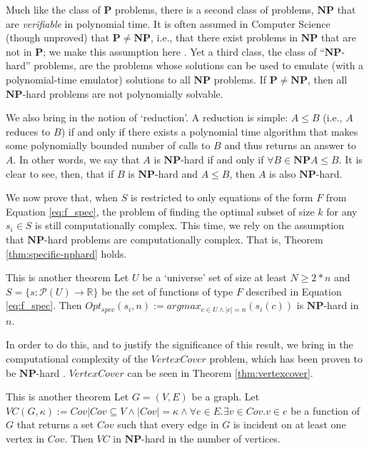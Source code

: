 Much like the class of $\mathbf{P}$ problems, there is a second class of problems, $\mathbf{NP}$ that are \textit{verifiable} in polynomial time. It is often assumed in Computer Science (though unproved) that $\mathbf{P} \neq \mathbf{NP}$, i.e., that there exist problems in $\mathbf{NP}$ that are not in $\mathbf{P}$; we make this assumption here \cite{COPPERSMITH198527}. Yet a third class, the class of ``$\mathbf{NP}$-hard'' problems, are the problems whose solutions can be used to emulate (with a polynomial-time emulator) solutions to all $\mathbf{NP}$ problems. If $\mathbf{P} \neq \mathbf{NP}$, then all $\mathbf{NP}$-hard problems are not polynomially solvable.

We also bring in the notion of `reduction'. A reduction is simple: $A \leq B$ (i.e., $A$ reduces to $B$) if and only if there exists a polynomial time algorithm that makes some polynomially bounded number of calls to $B$ and thus returns an answer to $A$. In other words, we say that $A$ is $\mathbf{NP}$-hard if and only if $\forall B \in \mathbf{NP} A \leq B$. It is clear to see, then, that if $B$ is $\mathbf{NP}$-hard and $A \leq B$, then $A$ is also $\mathbf{NP}$-hard.

We now prove that, when $S$ is restricted to only equations of the form $F$ from Equation \ref{eq:f_spec}, the problem of finding the optimal subset of size $k$ for any $s_i \in S$ is still computationally complex. This time, we rely on the assumption that $\mathbf{NP}$-hard problems are computationally complex. That is, Theorem \ref{thm:specific-nphard} holds. 

\begin{theorem}\label{thm:specific-nphard}
    This is another theorem
    Let $U$ be a `universe' set of size at least $N \geq 2*n$ and $S = \{s: \mathcal{P} (U) \rightarrow \mathbb{R}\}$ be the set of functions of type $F$ described in Equation \ref{eq:f_spec}. Then $Opt_{spec}(s_i, n) := argmax_{c \in U \land |c| = n}(s_i(c))$ is $\mathbf{NP}$-hard in $n$.
\end{theorem}

In order to do this, and to justify the significance of this result, we bring in the computational complexity of the $VertexCover$ problem, which has been proven to be $\mathbf{NP}$-hard \cite{COPPERSMITH198527}. $VertexCover$ can be seen in Theorem \ref{thm:vertexcover}.

\begin{theorem}\label{thm:vertexcover}
    This is another theorem
    Let $G = (V, E)$ be a graph. Let $VC(G, \kappa) := Cov | Cov \subseteq V \land |Cov| = \kappa \land \forall e \in E . \exists v \in Cov . v \in e$ be a function of $G$ that returns a set $Cov$ such that every edge in $G$ is incident on at least one vertex in $Cov$. Then $VC$ in $\mathbf{NP}$-hard in the number of vertices.
\end{theorem}

